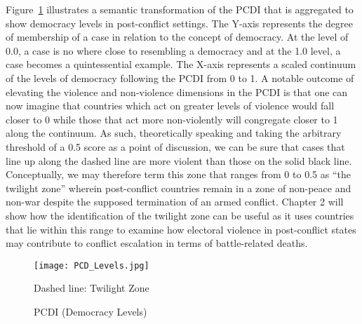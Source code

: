 \documentclass [11pt]{article}
\begin{document}
Figure~\ref{fig4} illustrates a semantic transformation of the PCDI that is aggregated to show democracy levels in post-conflict settings. The Y-axis represents the degree of membership of a case in relation to the concept of democracy. At the level of 0.0, a case is no where close to resembling a democracy and at the 1.0 level, a case becomes a quintessential example. The X-axis represents a scaled continuum of the levels of democracy following the PCDI from 0 to 1. A notable outcome of elevating the violence and non-violence dimensions in the PCDI is that one can now imagine that countries which act on greater levels of violence would fall closer to 0 while those that act more non-violently will congregate closer to 1 along the continuum. As such, theoretically speaking and taking the arbitrary threshold of a 0.5 score as a point of discussion, we can be sure that cases that line up along the dashed line are more violent than those on the solid black line. Conceptually, we may therefore term this zone that ranges from 0 to 0.5 as ``the twilight zone'' wherein post-conflict countries remain in a zone of non-peace and non-war despite the supposed termination of an armed conflict. Chapter 2 will show how the identification of the twilight zone can be useful as it uses countries that lie within this range to examine how electoral violence in post-conflict states may contribute to conflict escalation in terms of battle-related deaths.

\begin{figure} [h!]

\caption{PCDI (Democracy Levels)}
\label{fig4}%
\begin{center} 
\small
 \texttt{[image: PCD\_Levels.jpg]}
 
{\footnotesize Dashed line: Twilight Zone}

\end{center} 
\end{figure}
\end{document}

